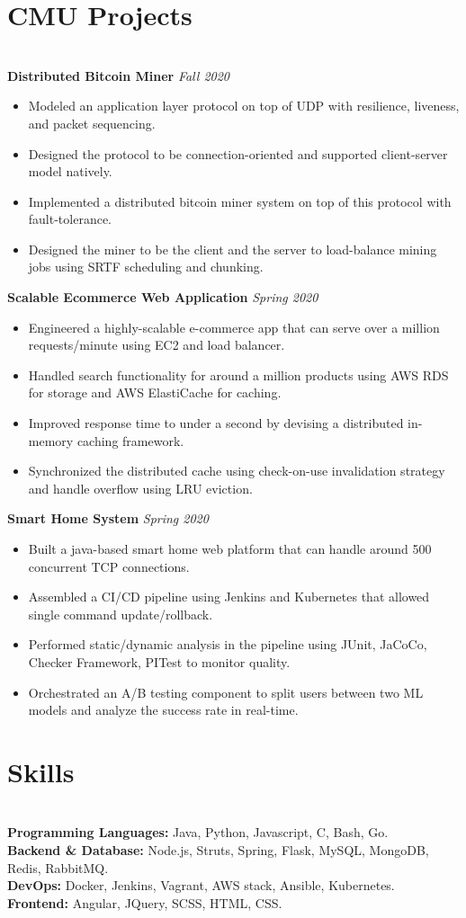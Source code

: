 \documentclass{resume}
\begin{document}
\section*{CMU Projects}
\titlerule
\noindent
\\
\textbf{Distributed Bitcoin Miner} \hfill \textit{Fall 2020}
\begin{itemize}
  \item Modeled an application layer protocol on top of UDP with resilience, liveness, and packet sequencing.
  \item Designed the protocol to be connection-oriented and supported client-server model natively.
  \item Implemented a distributed bitcoin miner system on top of this protocol with fault-tolerance.
  \item Designed the miner to be the client and the server to load-balance mining jobs using SRTF scheduling and chunking.
\end{itemize}
\textbf{Scalable Ecommerce Web Application} \hfill \textit{Spring 2020}
\begin{itemize}
  \item Engineered a highly-scalable e-commerce app that can serve over a million requests/minute using EC2 and load balancer.
  \item Handled search functionality for around a million products using AWS RDS for storage and AWS ElastiCache for caching.
  \item Improved response time to under a second by devising a distributed in-memory caching framework.
  \item Synchronized the distributed cache using check-on-use invalidation strategy and handle overflow using LRU eviction.
\end{itemize}
\textbf{Smart Home System} \hfill \textit{Spring 2020}
\begin{itemize}
  \item Built a java-based smart home web platform that can handle around 500 concurrent TCP connections.
  \item Assembled a CI/CD pipeline using Jenkins and Kubernetes that allowed single command update/rollback.
  \item Performed static/dynamic analysis in the pipeline using JUnit, JaCoCo, Checker Framework, PITest to monitor quality.
  \item Orchestrated an A/B testing component to split users between two ML models and analyze the success rate in real-time.
\end{itemize}
\section*{Skills}
\titlerule
\noindent
\\
\textbf{Programming Languages:} Java, Python, Javascript, C, Bash, Go. \\
\textbf{Backend \& Database:} Node.js, Struts, Spring, Flask, MySQL, MongoDB, Redis, RabbitMQ. \\
\textbf{DevOps:} Docker, Jenkins, Vagrant, AWS stack, Ansible, Kubernetes. \\
\textbf{Frontend:} Angular, JQuery, SCSS, HTML, CSS.
\end{document}
